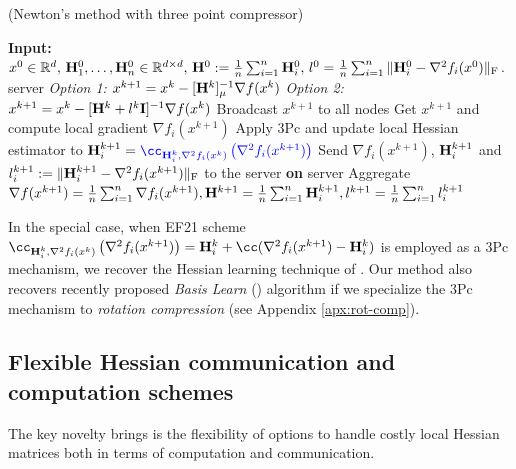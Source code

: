 \documentclass[11pt]{article}
\begin{document}
	\begin{algorithm}[H]
		\caption{ (Newton's method with {\color{blue}three point compressor}) }
		\label{alg:N3Pc}
		\begin{algorithmic}[1]
			\STATE \textbf{Input:} $x^0\in\mathbb{R}^d,\, \mathbf{H}_1^0, \dots, \mathbf{H}_n^0 \in \mathbb{R}^{d\times d},\, \mathbf{H}^0 \; { := }\; \frac{1}{n}\sum_{i=1}^n \mathbf{H}_i^0,\, l^0 = \frac{1}{n}\sum_{i=1}^n \|\mathbf{H}_i^0 - \nabla^2 f_i(x^0)\|_{\rm F}$.
			 server 
			\STATE \quad \textit{Option 1:} $x^{k+1} = x^k - [\mathbf{H}^{k}]_{\mu}^{-1} \nabla f(x^k)$
			\STATE \quad \textit{Option 2:} $x^{k+1} = x^k - [\mathbf{H}^{k} + l^k\mathbf{I}]^{-1} \nabla f(x^k)$
			\STATE \quad Broadcast $x^{k+1}$ to all nodes
			\STATE Get $x^{k+1}$ and compute local gradient $\nabla f_i(x^{k+1})$ %
			\STATE Apply {\color{blue}3Pc} and update local Hessian estimator to $\mH_i^{k+1} = {\color{blue}\cc_{\mH_i^k,\nabla^2f_i(x^k)}\left(\nabla^2f_i(x^{k+1})\right)}$
			\STATE Send $\nabla f_i(x^{k+1})$,\; $\mathbf{H}^{k+1}_i$ and $l_i^{k+1} \; { := }\; \|\mathbf{H}_i^{k+1} - \nabla^2 f_i(x^{k+1})\|_{\rm F}$ to the server
			\ENDFOR
			\STATE \textbf{on} server
			\STATE \quad Aggregate $ \nabla f(x^{k+1}) = \frac{1}{n}\sum_{i=1}^n \nabla f_i(x^{k+1}), \mathbf{H}^{k+1} = \frac{1}{n}\sum_{i=1}^n\mathbf{H}_i^{k+1}, l^{k+1} = \frac{1}{n}\sum_{i=1}^n l_i^{k+1}$
		\end{algorithmic}
	\end{algorithm}
	
	
	In the special case, when EF21 scheme $\cc_{\mH_i^k,\nabla^2f_i(x^k)}\left(\nabla^2f_i(x^{k+1})\right) = \mH_i^k + \cc(\nabla^2f_i(x^{k+1}) - \mH_i^k)$ is employed as a 3Pc mechanism, we recover the Hessian learning technique of . Our  method also recovers recently proposed {\em Basis Learn} () \citep{qian2021basis} algorithm if we specialize the 3Pc mechanism to {\em rotation compression} (see Appendix \ref{apx:rot-comp}).
	
	\subsection{Flexible Hessian communication and computation schemes}
	The key novelty  brings is the flexibility of options to handle costly local Hessian matrices both in terms of computation and communication.
	
\end{document}
